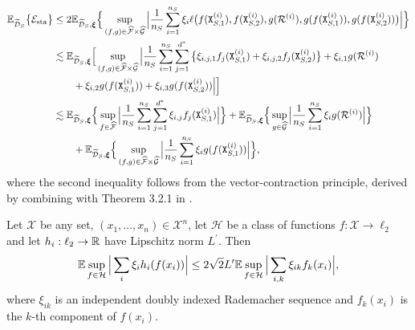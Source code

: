     \begin{align}\label{eq: Esta < complexity}
    \mathbb{E}_{\widetilde{\mathcal{D}}_S}\big\{\mathcal{E}_{\mathrm{sta}}\big\}&\leq 2\mathbb{E}_{\widetilde{\mathcal{D}}_S, \bm{\xi}}\Big\{\sup_{(f, g) \in \widehat{\mathcal{F}} \times \widehat{\mathcal{G}}}\Big\vert\frac{1}{n_S}\sum_{i=1}^{n_S}\xi_i\ell\big(f(\mathtt{X}_{S,1}^{(i)}), f(\mathtt{X}_{S,2}^{(i)}), g(\mathcal{R}^{(i)}), g(f(\mathtt{X}_{S,1}^{(i)})), g(f(\mathtt{X}_{S,2}^{(i)}))\big)\Big\vert\Big\} \nonumber \\
    &\lesssim \mathbb{E}_{\widetilde{\mathcal{D}}_S, \bm{\xi}}\Big[\sup_{(f, g) \in \widehat{\mathcal{F}} \times \widehat{\mathcal{G}}}\Big\vert\frac{1}{n_S}\sum_{i=1}^{n_S}\sum_{j=1}^{d^*}\big\{\xi_{i,j,1}f_j(\mathtt{X}_{S,1}^{(i)})+ \xi_{i,j,2}f_j(\mathtt{X}_{S,2}^{(i)})\big\} + \xi_{i,1}g(\mathcal{R}^{(i)})  \nonumber\\
    &\qquad +\xi_{i,2}g(f(\mathtt{X}_{S,1}^{(i)})) + \xi_{i,3}g(f(\mathtt{X}_{S,2}^{(i)}))\Big\vert\Big] \nonumber\\
    &\lesssim \mathbb{E}_{\widetilde{\mathcal{D}}_S, \bm{\xi}}\Big\{\sup_{f \in \widehat{\mathcal{F}}}\Big\vert\frac{1}{n_S}\sum_{i=1}^{n_S}\sum_{j=1}^{d^*}\xi_{i,j}f_j(\mathtt{X}_{S,1}^{(i)})\Big\vert\Big\}+  \mathbb{E}_{\widetilde{\mathcal{D}}_S, \bm{\xi}}\Big\{\sup_{g \in \widehat{\mathcal{G}}}\Big\vert\frac{1}{n_S}\sum_{i=1}^{n_S}\xi_{i}g(\mathcal{R}^{(i)})\Big\vert\Big\} \nonumber\\ 
    &\qquad+ \mathbb{E}_{\widetilde{\mathcal{D}}_S, \bm{\xi}}\Big\{\sup_{(f,g) \in \widehat{\mathcal{F}} \times \widehat{\mathcal{G}}}\Big\vert\frac{1}{n_S}\sum_{i=1}^{n_S}\xi_{i}g(f(\mathtt{X}_{S,1}^{(i)}))\Big\vert\Big\},
    \end{align}
    where the second inequality follows from the vector-contraction principle, derived by combining \citet{maurer2016vectorcontraction} with Theorem 3.2.1 in \citet{gine2016mathematical}.
    \begin{lemma}
    \label{lemma: vector-contraction principle}
    Let $\mathcal{X}$ be any set, $(x_1, \ldots, x_n) \in \mathcal{X}^n$, let $\mathcal{H}$ be a class of functions $f:\mathcal{X} \rightarrow \ell_2$ and let $h_i: \ell_2 \rightarrow \mathbb{R}$ have Lipschitz norm $L^\prime$. Then
    \begin{align*}
    \mathbb{E}\sup_{f \in \mathcal{H}}\Big\vert\sum_i\xi_ih_i(f(x_i))\Big\vert \leq 2\sqrt{2}L^\prime\mathbb{E}\sup_{f \in \mathcal{H}}\Big\vert\sum_{i,k}\xi_{ik}f_k(x_i)\Big\vert,
    \end{align*}
    where $\xi_{ik}$ is an independent doubly indexed Rademacher sequence and $f_k(x_i)$ is the $k$-th component of $f(x_i)$.
    \end{lemma}
